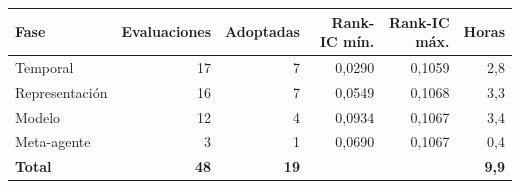 \begin{tabular}{lrrrrr}
\toprule
Fase & Evaluaciones & Adoptadas & Rank-IC mín. & Rank-IC máx. & Horas \\
\midrule
Temporal & 17 & 7 & 0,0290 & 0,1059 & 2,8 \\
Representación & 16 & 7 & 0,0549 & 0,1068 & 3,3 \\
Modelo & 12 & 4 & 0,0934 & 0,1067 & 3,4 \\
Meta-agente & 3 & 1 & 0,0690 & 0,1067 & 0,4 \\
\textbf{Total} & \textbf{48} & \textbf{19} &  &  & \textbf{9,9} \\
\bottomrule
\end{tabular}
